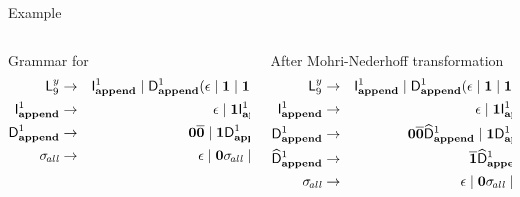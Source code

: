 \begin{frame}{Example}
  \scriptsize
  \begin{columns}[c]
    \begin{column}[T]{.5\textwidth}
      {Grammar for }
      \begin{eqnarray*}
        \mathsf{L}_{{9}}^{y}  &\rightarrow&  {\mathsf{I}_{\mathit {\mathbf{append}}}^{1}} \mid  {\ensuremath{\mathsf{D}_{\mathit {\mathbf{append}}}^{1}}}        (\epsilon         \mid        \mathbf{1}   \mid
        \mathbf{1}\mathbf{0} {\sigma_{\mathit{\!all}}})\\
        \mathsf{I}_{\mathit {\mathbf{append}}}^{1}    &\rightarrow&    \epsilon   \mid
        \mathbf{1}{\mathsf{I}_{\mathit {\mathbf{append}}}^{1}}\\         
        \mathsf{D}_{\mathit {\mathbf{append}}}^{1}
        &\rightarrow&               \mathbf{0}\overline{\mathbf{0}}               \mid
        \mathbf{1}\mathsf{D}_{\mathit {\mathbf{append}}}^{1}\overline{\mathbf{1}}\\
        \sigma_{\mathit{\!all}} &\rightarrow & \epsilon \mid \mathbf{0}
        \sigma_{\mathit{\!all}} \mid \mathbf{1}
        \sigma_{\mathit{\!all}}
      \end{eqnarray*}
    \end{column}
    \begin{column}[T]{.5\textwidth}
      After Mohri-Nederhoff transformation
      \begin{eqnarray*}
        \mathsf{L}_{{9}}^{y}  &\rightarrow&  {\mathsf{I}_{\mathit {\mathbf{append}}}^{1}} \mid  {\ensuremath{\mathsf{D}_{\mathit {\mathbf{append}}}^{1}}}        (\epsilon         \mid        \mathbf{1}   \mid
        \mathbf{1}\mathbf{0} {\sigma_{\mathit{\!all}}})\\
        \mathsf{I}_{\mathit {\mathbf{append}}}^{1}    &\rightarrow&    \epsilon   \mid
        \mathbf{1}{\mathsf{I}_{\mathit {\mathbf{append}}}^{1}}\\   
        \mathsf{D}_{\mathit {\mathbf{append}}}^{1}
        &\rightarrow&               \mathbf{0}\overline{\mathbf{0}} \widehat{\mathsf{D}}_{\mathit {\mathbf{append}}}^{1}  \mid
        \mathbf{1}\mathsf{D}_{\mathit {\mathbf{append}}}^{1} \\ 
                {\widehat{\mathsf{D}}_{\mathit {\mathbf{append}}}^{1}}  &\rightarrow&   \overline{\mathbf{1}}{\widehat{\mathsf{D}}_{\mathit {\mathbf{append}}}^{1}}
                \mid \epsilon \\
                \sigma_{\mathit{\!all}} &\rightarrow & \epsilon \mid \mathbf{0}
                \sigma_{\mathit{\!all}} \mid \mathbf{1}
                \sigma_{\mathit{\!all}}
      \end{eqnarray*}
    \end{column}
  \end{columns}
\end{frame}
